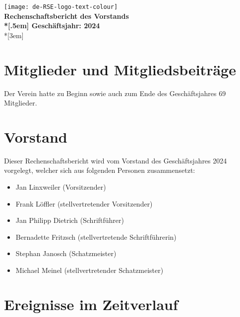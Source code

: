 \newcommand{\jahr}{2024}
\newcommand{\todo}[1]{\textcolor{red}{ToDo: #1}}



\thispagestyle{empty}

\begin{centering}
\texttt{[image: de-RSE-logo-text-colour]}\\
\vspace{3em}
\textbf{
 \Large Rechenschaftsbericht des Vorstands\\*[.5em]
 \normalsize Geschäftsjahr: \jahr}\\*[3em]
\end{centering}

\section{Mitglieder und Mitgliedsbeiträge}

Der Verein hatte zu Beginn sowie auch zum Ende des Geschäftsjahres 69 Mitglieder.

\section{Vorstand}

Dieser Rechenschaftsbericht wird vom Vorstand des Geschäftsjahres 2024 vorgelegt, welcher sich aus folgenden Personen zusammensetzt:

\begin{itemize}
  \setlength{\itemsep}{0pt plus 1pt}
  \item Jan Linxweiler (Vorsitzender)
  \item Frank Löffler (stellvertretender Vorsitzender)
  \item Jan Philipp Dietrich (Schriftführer)
  \item Bernadette Fritzsch (stellvertretende Schriftführerin)
  \item Stephan Janosch (Schatzmeister)
  \item Michael Meinel (stellvertretender Schatzmeister)
\end{itemize}

\section{Ereignisse im Zeitverlauf}

